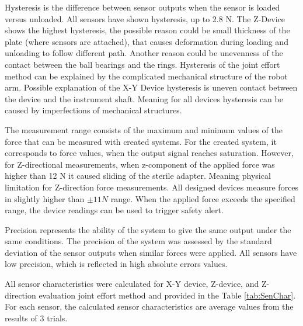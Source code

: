 Hysteresis is the difference between sensor outputs when the sensor is loaded versus unloaded. All sensors have shown hysteresis, up to 2.8 N. The Z-Device shows the highest hysteresis, the possible reason could be small thickness of the plate (where sensors are attached), that causes deformation during loading and unloading to follow different path. Another reason could be unevenness of the contact between the ball bearings and the rings. Hysteresis of the joint effort method can be explained by the complicated mechanical structure of the robot arm. Possible explanation of the X-Y Device hysteresis is uneven contact between the device and the instrument shaft. Meaning for all devices hysteresis can be caused by imperfections of mechanical structures.

The measurement range consists of the maximum and minimum values of the force that can be measured with created systems. For the created system, it corresponds to force values, when the output signal reaches saturation. However, for Z-directional measurements, when z-component of the applied force was higher than 12 N it caused sliding of the sterile adapter. Meaning physical limitation for Z-direction force measurements. All designed devices measure forces in slightly higher than $\pm 11 N$ range. When the applied force exceeds the specified range, the device readings can be used to trigger safety alert.

Precision represents the ability of the system to give the same output under the same conditions. The precision of the system was assessed by the standard deviation of the sensor outputs when similar forces were applied.  All sensors have low precision, which is reflected in high absolute errors values.

All sensor characteristics were calculated for X-Y device, Z-device, and Z-direction evaluation joint effort method and provided in the Table \ref{tab:SenChar}. For each sensor, the calculated sensor characteristics are average values from the results of 3 trials.

